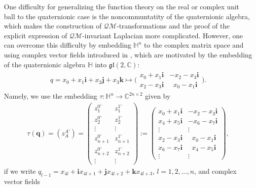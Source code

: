 \documentclass[a4paper,11pt]{amsart}
\numberwithin{equation}{section}
\begin{document}
One difficulty for generalizing the function theory on the real or complex unit ball to the quaternionic case is the noncommuntatity of the quaternionic algebra, which makes the construction of $\mathcal{QM}$-transformations and the proof of the explicit expression of $\mathcal{QM}$-invariant Laplacian more complicated. However, one can overcome this difficulty by embedding $\mathbb{H}^n$ to the complex matrix space and using complex vector fields introduced in \cite{wang5}, which are motivated by the embedding of the quaternionic algebra $\mathbb{H}$ into $\mathfrak{gl}(2,\mathbb{C})$:
\begin{equation}\begin{aligned}
q=x_0+x_1\mathbf{i}+x_2\mathbf{j}+x_3\mathbf{k}\mapsto \bigg(\begin{matrix}x_0+x_1\mathbf{i}&-x_2-x_3\mathbf{i}\\x_2-x_3\mathbf{i}&\;\;x_0-x_1\mathbf{i}\end{matrix}\bigg).
\end{aligned}\end{equation}
Namely, we use the embedding $\tau:\mathbb{H}^n\rightarrow\mathbb{C}^{2n\times 2}$ given by
\begin{equation}\begin{aligned}\label{zaa}
\tau(\mathbf{q})=(z_A^{A'})=\left(\begin{matrix}z_1^{0'}&z_1^{1'}\\z_2^{0'}&z_2^{1'}\\\vdots&\vdots\\z_{n+1}^{0'}&z_{n+1}^{1'}\\z_{n+2}^{0'}&z_{n+2}^{1'}\\\vdots&\vdots\end{matrix}\right):=\left(\begin{matrix}x_0+x_1\mathbf{i}&-x_2-x_3\mathbf{i}\\x_4+x_5\mathbf{i}&-x_6-x_7\mathbf{i}\\\vdots&\vdots\\x_2-x_3\mathbf{i}&\;\;x_0-x_1\mathbf{i}\\x_6-x_7\mathbf{i}&\;\;x_4-x_5\mathbf{i}\\\vdots&\vdots\end{matrix}\right),
\end{aligned}\end{equation}
if we write $q_{l-1}=x_{4l}+\mathbf{i}x_{4l+1}+\mathbf{j}x_{4l+2}+\mathbf{k}x_{4l+3}$, $l=1,2,\dots,n$, and complex vector fields
\end{document}
